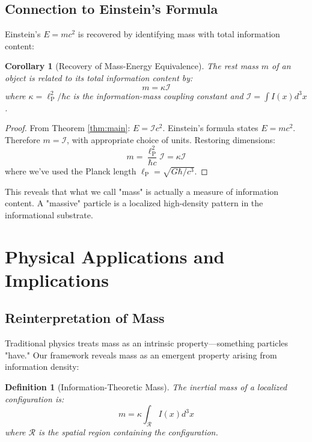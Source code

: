 \documentclass[12pt,a4paper]{article}
\newtheorem{corollary}[theorem]{Corollary}
\newtheorem{definition}[theorem]{Definition}
\theoremstyle{remark}
\newcommand{\lP}{\ell_{\text{P}}}
\begin{document}
\subsection{Connection to Einstein's Formula}

Einstein's $E = mc^2$ is recovered by identifying mass with total information content:

\begin{corollary}[Recovery of Mass-Energy Equivalence]
\label{cor:einstein}
The rest mass $m$ of an object is related to its total information content by:
\begin{equation}
m = \kappa \mathcal{I}
\end{equation}
where $\kappa = \lP^2/\hbar c$ is the information-mass coupling constant and $\mathcal{I} = \int I(x) d^3x$.
\end{corollary}

\begin{proof}
From Theorem \ref{thm:main}: $E = \mathcal{I}c^2$. Einstein's formula states $E = mc^2$. Therefore $m = \mathcal{I}$, with appropriate choice of units. Restoring dimensions:
\begin{equation}
m = \frac{\lP^2}{\hbar c} \mathcal{I} = \kappa \mathcal{I}
\end{equation}
where we've used the Planck length $\lP = \sqrt{G\hbar/c^3}$.
\end{proof}

This reveals that what we call "mass" is actually a measure of information content. A "massive" particle is a localized high-density pattern in the informational substrate.

\section{Physical Applications and Implications}
\label{sec:applications}

\subsection{Reinterpretation of Mass}
\label{sec:mass}

Traditional physics treats mass as an intrinsic property—something particles "have." Our framework reveals mass as an emergent property arising from information density:

\begin{definition}[Information-Theoretic Mass]
The inertial mass of a localized configuration is:
\begin{equation}
m = \kappa \int_{\mathcal{R}} I(x) d^3x
\end{equation}
where $\mathcal{R}$ is the spatial region containing the configuration.
\end{definition}
\end{document}
